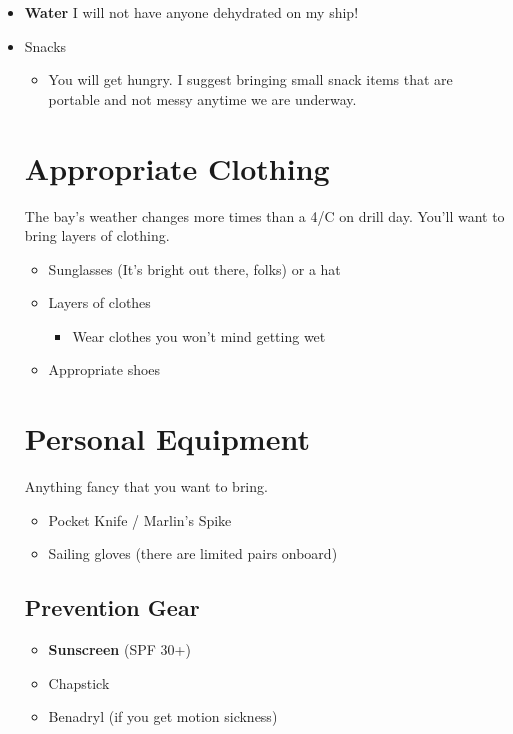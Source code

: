 \documentclass[fleqn,10pt]{navy} %
\begin{document}
\begin{itemize}[noitemsep]
    \item \textbf{Water} I will not have anyone dehydrated on my ship!
    \item Snacks
        \begin{itemize}
            \item You will get hungry.  I suggest bringing small snack items that are portable and not messy anytime we are underway.
        \end{itemize}

\section{Appropriate Clothing}
The bay's weather changes more times than a 4/C on drill day.  You'll want to bring layers of clothing.

\begin{itemize}[noitemsep]
    \item Sunglasses (It's bright out there, folks) or a hat
    \item Layers of clothes
        \begin{itemize}[noitemsep]
            \item Wear clothes you won't mind getting wet
        \end{itemize}
    \item Appropriate shoes
\end{itemize}

\section{Personal Equipment}
Anything fancy that you want to bring.

\begin{itemize}[noitemsep]
    \item Pocket Knife / Marlin's Spike
    \item Sailing gloves (there are limited pairs onboard)
\end{itemize}

\subsection{Prevention Gear}
\begin{itemize}[noitemsep]
    \item \textbf{Sunscreen} (SPF 30+)
    \item Chapstick 
    \item Benadryl (if you get motion sickness)
\end{itemize}
\end{itemize}
\end{document}
